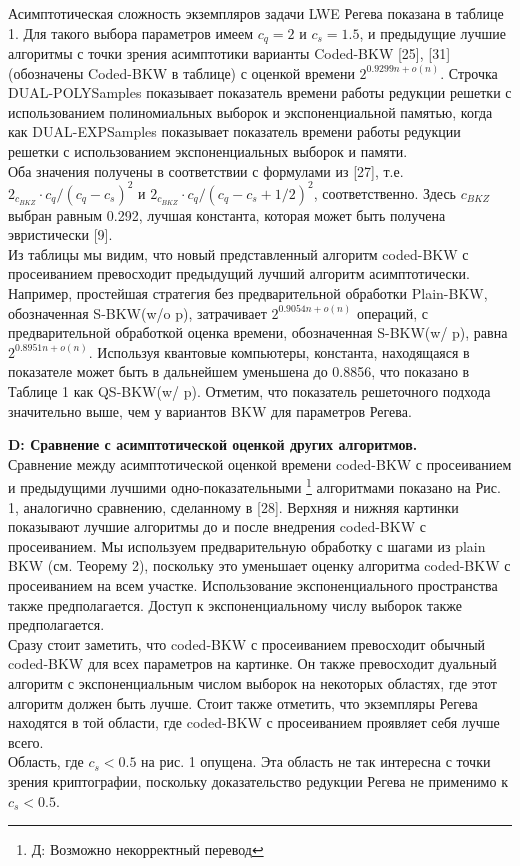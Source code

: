 \documentclass[a4paper,11pt]{article}
\begin{document}
Асимптотическая сложность экземпляров задачи LWE Регева показана в таблице 1. Для такого выбора параметров имеем $c_q=2$ и $c_s=1.5$, и предыдущие лучшие алгоритмы с точки зрения асимптотики варианты Coded-BKW [25], [31] (обозначены Coded-BKW в таблице) с оценкой времени $2^{0.9299n + o(n)}$. Строчка DUAL-POLYSamples показывает показатель времени работы редукции решетки с использованием полиномиальных выборок и экспоненциальной памятью, когда как DUAL-EXPSamples показывает показатель времени работы редукции решетки с использованием экспоненциальных выборок и памяти. \\
Оба значения получены в соответствии с формулами из [27], т.е. $2_{c_{BKZ}} \cdot c_q/(c_q - c_s)^2$ и $2_{c_{BKZ}} \cdot c_q/(c_q - c_s + 1/2)^2$, соответственно. Здесь $c_{BKZ}$ выбран равным 0.292, лучшая константа, которая может быть получена эвристически [9].\\
Из таблицы мы видим, что новый представленный алгоритм coded-BKW с просеиванием превосходит предыдущий лучший алгоритм асимптотически. Например, простейшая стратегия без предварительной обработки Plain-BKW, обозначенная S-BKW(w/o p), затрачивает $2^{0.9054n+o(n)}$ операций, с предварительной обработкой оценка времени, обозначенная S-BKW(w/ p), равна $2^{0.8951n+o(n)}$. Используя квантовые компьютеры, константа, находящаяся в показателе может быть в дальнейшем уменьшена до 0.8856, что показано в Таблице 1 как QS-BKW(w/ p). Отметим, что показатель решеточного подхода значительно выше, чем у вариантов BKW для параметров Регева.

\textbf{D: Сравнение с асимптотической оценкой других алгоритмов.}\\

Сравнение между асимптотической оценкой времени coded-BKW с просеиванием и предыдущими лучшими одно-показательными \footnote{Д: Возможно некорректный перевод} алгоритмами показано на Рис. 1, аналогично сравнению, сделанному в [28]. Верхняя и нижняя картинки показывают лучшие алгоритмы до и после внедрения coded-BKW с просеиванием. Мы используем предварительную обработку с шагами из plain BKW (см. Теорему 2), поскольку это уменьшает оценку алгоритма coded-BKW с просеиванием на всем участке. Использование экспоненциального пространства также предполагается. Доступ к экспоненциальному числу выборок также предполагается.\\
Сразу стоит заметить, что coded-BKW с просеиванием превосходит обычный coded-BKW для всех параметров на картинке. Он также превосходит дуальный алгоритм с экспоненциальным числом выборок на некоторых областях, где этот алгоритм должен быть лучше. Стоит также отметить, что экземпляры Регева находятся в той области, где coded-BKW с просеиванием проявляет себя лучше всего.\\
Область, где $c_s < 0.5$ на рис. 1 опущена. Эта область не так интересна с точки зрения криптографии, поскольку доказательство редукции Регева не применимо к $c_s < 0.5$.\\
\end{document}
